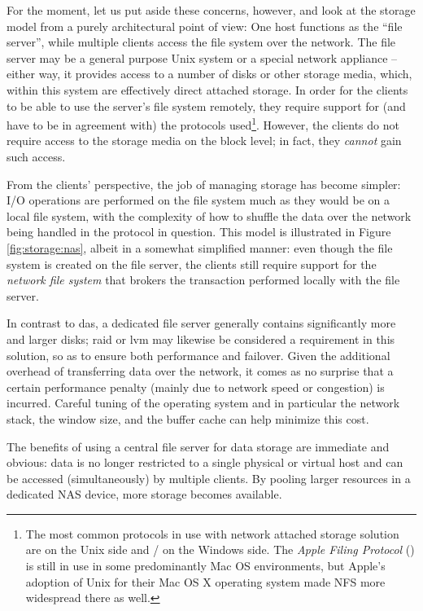 For the moment, let us put aside these concerns,
however, and look at the storage model from a purely
architectural point of view:  One host functions as
the ``file server'', while multiple clients access the
file system over the network.  The file server may be
a general purpose Unix system or a special network
appliance -- either way, it provides access to a
number of disks or other storage media, which, within
this system are effectively direct attached storage.
In order for the clients to be able to use the
server's file system remotely, they require support
for (and have to be in agreement with) the protocols
used\footnote{The most common protocols in use with
network attached storage solution are
 on the Unix side and
/
on the Windows side.  The {\em Apple Filing Protocol}
() is still in use in
some predominantly Mac OS environments, but Apple's
adoption of Unix for their Mac OS X operating system
made NFS more widespread there as well.}. However, the
clients do not require access to the storage media on
the block level; in fact, they {\em cannot} gain such
access.

From the clients' perspective, the job of managing
storage has become simpler:  I/O operations are
performed on the file system much as they would be on
a local file system, with the complexity of how to
shuffle the data over the network being handled in the
protocol in question.  This model is illustrated in
Figure \ref{fig:storage:nas}, albeit in a somewhat
simplified manner:  even though the file system is
created on the file server, the clients still require
support for the {\em network file system} that brokers the transaction
performed locally with the file server.

In contrast to \gls{das}, a dedicated file server
generally contains significantly more and larger
disks; \gls{raid} or \gls{lvm} may likewise
be considered a requirement in this solution, so as to
ensure both performance and failover.  Given the
additional overhead of transferring data over the
network, it comes as no surprise that a certain
performance penalty (mainly due to network speed or
congestion) is incurred.  Careful tuning of the
operating system and in particular the network stack,
the  window size, and the
buffer cache can help minimize this cost.

The benefits of using a central file server for data
storage are immediate and obvious: data is no longer
restricted to a single physical or virtual host and
can be accessed (simultaneously) by multiple clients.
By pooling larger resources in a dedicated NAS device,
more storage becomes available.

